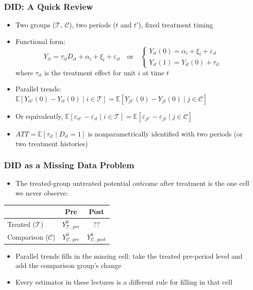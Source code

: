 \documentclass[xcolor=svgnames,9pt,english, aspectratio=169]{beamer}
\newcommand{\E}{\ensuremath{\mathbb{E}}}
\newcommand{\Tset}{\ensuremath{\mathcal{T}}}
\newcommand{\Cset}{\ensuremath{\mathcal{C}}}
\begin{document}
\begin{frame}
  \frametitle{DID: A Quick Review}
\begin{itemize}[<+->]\itemsep0.8em
\item Two groups ($\Tset$, $\Cset$), two periods ($t$ and $t'$), fixed treatment timing
\item Functional form:
\begin{equation*}
Y_{it} = \tau_{it} D_{it} + \alpha_i + \xi_t + \varepsilon_{it}
\quad\text{or}\quad
\begin{cases}
Y_{it}(0) = \alpha_i + \xi_t + \varepsilon_{it}\\
Y_{it}(1) = Y_{it}(0) + \tau_{it}
\end{cases}
\end{equation*}
where $\tau_{it}$ is the treatment effect for unit $i$ at time $t$
\item Parallel trends:
$\E[Y_{it'}(0) - Y_{it}(0) \mid i \in \Tset] = \E[Y_{jt'}(0) - Y_{jt}(0) \mid j \in \Cset]$
\item Or equivalently,
$\E[\varepsilon_{it'} - \varepsilon_{it} \mid i \in \Tset] = \E[\varepsilon_{jt'} - \varepsilon_{jt} \mid j \in \Cset]$
\item $ATT = \E[\tau_{it} \mid D_{it} = 1]$ is nonparametrically identified with two periods (or two treatment histories)
\end{itemize}
\end{frame}

\begin{frame}
  \frametitle{DID as a Missing Data Problem}
\begin{itemize}\itemsep0.8em
\item The treated-group untreated potential outcome after treatment is the one cell we never observe:
\end{itemize}
\begin{center}
\renewcommand{\arraystretch}{1.4}
\begin{tabular}{lcc}
 & Pre & Post \\ \hline
Treated ($\Tset$) & $Y^0_{\Tset,\,pre}$ & \alert{??} \\
Comparison ($\Cset$) & $Y^0_{\Cset,\,pre}$ & $Y^0_{\Cset,\,post}$ \\ \hline
\end{tabular}
\end{center}
\bigskip\pause
\begin{itemize}\itemsep0.8em
\item Parallel trends fills in the missing cell: take the treated pre-period level and add the comparison group's change
\item Every estimator in these lectures is a different rule for filling in that cell
\end{itemize}
\end{frame}
\end{document}

